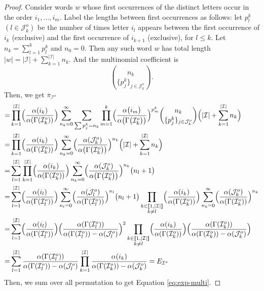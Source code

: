 \documentclass{llncs}
\begin{document}
\begin{proof}
Consider words $w$ whose first occurrences of the distinct letters occur in the order $i_1,\dots,i_m$.  Label the lengths between first occurrences as follows: let $p^k_l$~$(l\in\mathcal{J}_k^o)$ be the number of times letter $i_l$ appears between the first occurrence of $i_k$ (exclusive) and the first occurrence of $i_{k+1}$ (exclusive), for $l\le k$.
Let 
$n_k = \sum_{l=1}^k p^k_l $ and  $n_0=0$.
Then any such word $w$ has total length 
$|w|=|\mathcal{I}|+\sum_{k=1}^{|\mathcal{I}|} n_k$. And the multinomial coefficient is
$$\binom{n_k}{\{p_j^k\}_{j\in\mathcal{J}_k^o}}.$$
Then, we get $\overline{\pi}_{\mathcal{I}^o}$
$$
\begin{aligned}
= & \prod_{k=1}^{|\mathcal{I}|}\Bigl(\frac{\alpha({i_k})}{\alpha({\Gamma(\mathcal{I}_k^o)})}\Bigr) \sum_{n_k=0}^{\infty} \sum_{\sum p^k_j=n_k} \prod_{m=1}^k\Bigl(\frac{\alpha\bigl({i_m}\bigr)}{\alpha\bigl({\Gamma\bigl(\mathcal{I}_k^o\bigr)}\bigr)}\Bigr)^{p_m^k}\binom{n_k}{\{p_j^k\}_{j\in\mathcal{J}_k^o}}\Bigl(|\mathcal{I}|+\sum_{k=1}^{|\mathcal{I}|} n_k\Bigr) \\
= & \prod_{k=1}^{|\mathcal{I}|}\Bigl(\frac{\alpha({i_k})}{\alpha({\Gamma(\mathcal{I}_k^o)})}\Bigr) \sum_{n_k=0}^{\infty}\Bigl(\frac{\alpha({\mathcal{J}_k^o})}{\alpha\big(\Gamma\bigl(\mathcal{I}_k^o\bigr)\big)}\Bigr)^{n_k}\Bigl(|\mathcal{I}|+\sum_{k=1}^{|\mathcal{I}|} n_k\Bigr) \\
= & \sum_{l=1}^{|\mathcal{I}|} \prod_{k=1}^{|\mathcal{I}|}\Bigl(\frac{\alpha({i_k})}{\alpha({\Gamma(\mathcal{I}_k^o)})}\Bigr) \sum_{n_k=0}^{\infty}\Bigl(\frac{\alpha({\mathcal{J}_k^o})}{\alpha\big(\Gamma\bigl(\mathcal{I}_k^o\bigr)\big)}\Bigr)^{n_k}\bigl(n_l+1\bigr) \\
= & \sum_{l=1}^{|\mathcal{I}|}\Bigl(\frac{\alpha({i_l})}{ \alpha({\Gamma(\mathcal{I}_l^o)})}\Bigr) \sum_{n_l=0}^{\infty}\Bigl(\frac{\alpha({\mathcal{J}_l^o})}{ \alpha({\Gamma(\mathcal{I}_l^o)})}\Bigr)^{n_l}\bigl(n_l+1\bigr) \prod_{\substack{k \in[\![1,|\mathcal{I}|]\!]\\ k\neq l}}\Bigl(\frac{\alpha({i_k})}{\alpha({\Gamma(\mathcal{I}_k^o)}) }\Bigr)\sum_{n_k=0}^{\infty}\Bigl(\frac{ \alpha({\mathcal{J}_k^o})}{ \alpha({\Gamma(\mathcal{I}_k^o)} )}\Bigr)^{n_k} \\
= & \sum_{l=1}^{|\mathcal{I}|}\Bigl(\frac{\alpha({i_l})}{ \alpha({\Gamma(\mathcal{I}_l^o)})}\Bigr)\Bigl(\frac{ \alpha({\Gamma(\mathcal{I}_l^o)})}{ \alpha({\Gamma(\mathcal{I}_l^o)})- \alpha({\mathcal{J}_l^o})}\Bigr)^2 \prod_{{\substack{k \in[\![1,|\mathcal{I}|]\!]\\ k\neq l}}}\Bigl(\frac{\alpha({i_k})}{ \alpha({\Gamma(\mathcal{I}_k^o)})}\Bigr)\Bigl(\frac{ \alpha({\Gamma(\mathcal{I}_k^o)})}{\alpha({\Gamma(\mathcal{I}_k^o)})-\alpha({\mathcal{J}_k^o})}\Bigr) \\
= & \sum_{l=1}^{|\mathcal{I}|} \frac{\alpha({\Gamma(\mathcal{I}_l^o)})}{\alpha({\Gamma(\mathcal{I}_l^o)})-\alpha({\mathcal{J}_l^o})} \prod_{k=1}^{|\mathcal{I}|} \frac{\alpha({i_k})}{\alpha({\Gamma(\mathcal{I}_k^o)})-\alpha({\mathcal{J}_k^o})}
=E_{\mathcal{I}^o}
\end{aligned}
$$
Then, we sum over all permutation to get Equation \eqref{eq:exp-multi}.
\end{proof}
\end{document}
